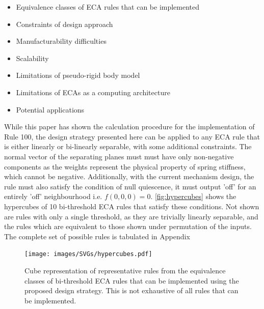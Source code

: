 \begin{itemize}
    \item Equivalence classes of ECA rules that can be implemented
    \item Constraints of design approach
    \item Manufacturability difficulties
    \item Scalability
    \item Limitations of pseudo-rigid body model
    \item Limitations of ECAs as a computing architecture
    \item Potential applications

\end{itemize}
While this paper has shown the calculation procedure for the implementation of Rule 100, the design strategy presented here can be applied to any ECA rule that is either linearly or bi-linearly separable, with some additional constraints. The normal vector of the separating planes must must have only non-negative components as the weights represent the physical property of spring stiffness, which cannot be negative. Additionally, with the current mechanism design, the rule must also satisfy the condition of null quiescence, it must output 'off' for an entirely 'off' neighbourhood i.e. \(f(0,0,0) =0\). \autoref*{fig:hypercubes} shows the hypercubes of 10 bi-threshold ECA rules that satisfy these conditions. Not shown are rules with only a single threshold, as they are trivially linearly separable, and the rules which are equivalent to those shown under permutation of the inputs. The complete set of possible rules is tabulated in Appendix %

\begin{figure}[H]
    \centering
    \texttt{[image: images/SVGs/hypercubes.pdf]}
    \caption{Cube representation of representative rules from the equivalence classes of bi-threshold ECA rules that can be implemented using the proposed design strategy. This is not exhaustive of all rules that can be implemented.}
    \label{fig:hypercubes}
\end{figure}






